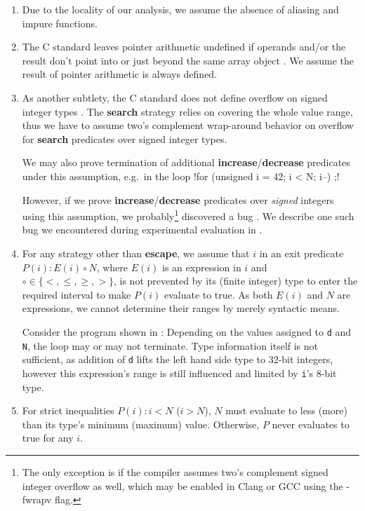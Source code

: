 \begin{enumerate}
    \item Due to the locality of our analysis, we assume the absence of aliasing and impure functions.
    \item The C standard leaves pointer arithmetic undefined if operands and/or the result don't point into or just beyond the same array object \cite[6.5.6]{ISO:2011:IIIb}. We assume the result of pointer arithmetic is always defined.
    \item As another subtlety, the C standard does not define overflow on signed integer types \cite[6.5.6]{ISO:2011:IIIb}. The \textbf{search} strategy relies on covering the whole value range, thus we have to assume two's complement wrap-around behavior on overflow for \textbf{search} predicates over signed integer types.
        
        We may also prove termination of additional \textbf{increase}/\textbf{decrease} predicates under this assumption, e.g.\ in the loop !for (unsigned i = 42; i < N; i--) ;!
        
        However, if we prove \textbf{increase}/\textbf{decrease} predicates over \emph{signed} integers using this assumption, we probably\footnote{The only exception is if the compiler assumes two's complement signed integer overflow as well, which may be enabled in Clang or GCC using the -fwrapv flag.} discovered a bug \cite{DBLP:conf/icse/DietzLRA12}. We describe one such bug we encountered during experimental evaluation in .
    \item For any strategy other than \textbf{escape}, we assume that $i$ in an exit predicate $P(i): E(i) \circ N$, where $E(i)$ is an expression in $i$ and $\circ \in \{ <, \le, \ge, > \}$, is not prevented by its (finite integer) type to enter the required interval to make $P(i)$ evaluate to true. As both $E(i)$ and $N$ are expressions, we cannot determine their ranges by merely syntactic means.
        \begin{example}
        Consider the program shown in : Depending on the values assigned to \verb!d! and \verb!N!, the loop may or may not terminate. Type information itself is not sufficient, as addition of \verb!d! lifts the left hand side type to 32-bit integers, however this expression's range is still influenced and limited by \verb!i!'s 8-bit type.
        \end{example}
    \item For strict inequalities $P(i): i < N$ ($i > N$), $N$ must evaluate to less (more) than its type's minimum (maximum) value. Otherwise, $P$ never evaluates to true for any $i$.
\end{enumerate}

